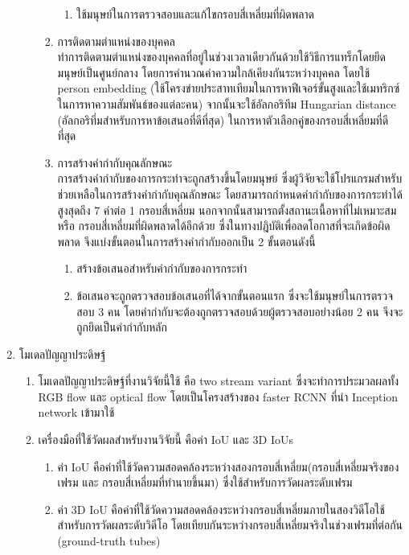 \begin{enumerate}
\begin{enumerate}
\begin{enumerate}
\begin{enumerate}
				\item ใช้มนุษย์ในการตรวจสอบและแก้ไขกรอบสี่เหลี่ยมที่ผิดพลาด
			\end{enumerate}	
			\item การติดตามตำแหน่งของบุคคล\\
			ทำการติดตามตำแหน่งของบุคคลที่อยู่ในช่วงเวลาเดียวกันด้วยใช้วิธีการแทร็กโดยยึดมนุษย์เป็นศูนย์กลาง โดยการคำนวณค่าความใกล้เคียงกันระหว่างบุคคล 
			โดยใช้ person embedding (ใช้โครงข่ายประสาทเทียมในการหาฟีเจอร์ขั้นสูงและใช้เมทริกซ์ในการหาความสัมพันธ์ของแต่ละคน) จากนั้นจะใช้อัลกอริทึม Hungarian distance (อัลกอริทึ่มสำหรับการหาข้อเสนอที่ดีที่สุด) ในการหาตัวเลือกคู่ของกรอบสี่เหลี่ยมที่ดีที่สุด
			\item การสร้างคำกำกับคุณลักษณะ\\
			การสร้างคำกำกับของการกระทำจะถูกสร้างขึ้นโดยมนุษย์ ซึ่งผู้วิจัยจะใช้โปรแกรมสำหรับช่วยเหลือในการสร้างคำกำกับคุณลักษณะ โดยสามารถกำหนดคำกำกับของการกระทำได้สูงสุดถึง 7 คำต่อ 1 กรอบสี่เหลี่ยม นอกจากนั้นสามารถตั้งสถานะเนื้อหาที่ไม่เหมาะสม หรือ กรอบสี่เหลี่ยมที่ผิดพลาดได้อีกด้วย ซึ่งในทางปฎิบัติเพื่อลดโอกาสที่จะเกิดข้อผิดพลาด จึงแบ่งขั้นตอนในการสร้างคำกำกับออกเป็น 2 ขั้นตอนดังนี้
			\begin{enumerate}
				\setlength\itemsep{-0.25em}
				\item สร้างข้อเสนอสำหรับคำกำกับของการกระทำ
				\item ข้อเสนอจะถูกตรวจสอบข้อเสนอที่ได้จากขั้นตอนแรก ซึ่งจะใช้มนุษย์ในการตรวจสอบ 3 คน โดยคำกำกับจะต้องถูกตรวจสอบด้วยผู้ตรวจสอบอย่างน้อย 2 คน จึงจะถูกยึดเป็นคำกำกับหลัก
			\end{enumerate}
		\end{enumerate}
	\end{enumerate}
	\item {โมเดลปัญญาประดิษฐ์}
	\begin{enumerate}
		\item โมเดลปัญญาประดิษฐ์ที่งานวิจัยนี้ใช้ คือ two stream variant ซึ่งจะทำการประมวลผลทั้ง RGB flow และ optical flow 
		โดยเป็นโครงสร้างของ faster RCNN ที่นำ Inception network เข้ามาใช้
		\item เครื่องมือที่ใช้วัดผลสำหรับงานวิจัยนี้ คือค่า IoU และ 3D IoUs 
		\begin{enumerate}
			\item ค่า IoU คือค่าที่ใช้วัดความสอดคล้องระหว่างสองกรอบสี่เหลี่ยม(กรอบสี่เหลี่ยมจริงของเฟรม และ กรอบสี่เหลี่ยมที่ทำนายขึ้นมา) ซึ่งใช้สำหรับการวัดผลระดับเฟรม 
			\item ค่า 3D IoU คือค่าที่ใช้วัดความสอดคล้องระหว่างกรอบสี่เหลี่ยมภายในสองวิดีโอใช้สำหรับการวัดผลระดับวิดีโอ โดยเทียบกันระหว่างกรอบสี่เหลี่ยมจริงในช่วงเฟรมที่ต่อกัน (ground-truth tubes) 

\end{enumerate}
\end{enumerate}
\end{enumerate}
